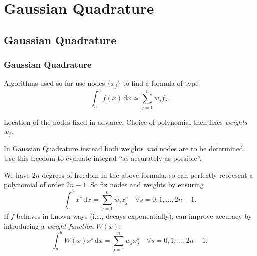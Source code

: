\documentclass{beamer}
\begin{document}
\section{Gaussian Quadrature}

\subsection{Gaussian Quadrature}

\begin{frame}
  \frametitle{Gaussian Quadrature}

  Algorithms used so far use nodes $\{x_j\}$ to find a formula of type
  \begin{equation*}
    \int_a^b f(x) \, \text{d}x \simeq \sum_{j=1}^n w_j f_j.
  \end{equation*}
  \begin{overlayarea}{\textwidth}{0.5\textheight}
    {
      Location of the nodes fixed in advance. Choice of
      polynomial then fixes \emph{weights} $w_j$.
    }
    {
      In Gaussian Quadrature instead both weights \emph{and} nodes are
      to be determined.  Use this freedom to evaluate integral ``as
      accurately as possible''.
      \vspace{1ex}

    }
    {
      We have $2n$ degrees of freedom in the above formula, so
      can perfectly represent a polynomial of order
      $2n-1$. So  fix nodes and weights by ensuring
      \begin{equation*}
        \int_a^b x^s \, \text{d}x = \sum_{j=1}^n w_j x_j^s \quad
        \forall s = 0, 1, \dots, 2 n - 1.
      \end{equation*}
    }
    {
      If $f$ behaves in known ways (i.e., decays exponentially), can
      improve accuracy by introducing a \emph{weight function} $W(x)$:
      \begin{equation*}
        \int_a^b W(x) x^s \, \text{d}x = \sum_{j=1}^n w_j x_j^s
        \quad \forall s = 0, 1, \dots, 2 n - 1.
      \end{equation*}
    }
  \end{overlayarea}

\end{frame}
\end{document}
